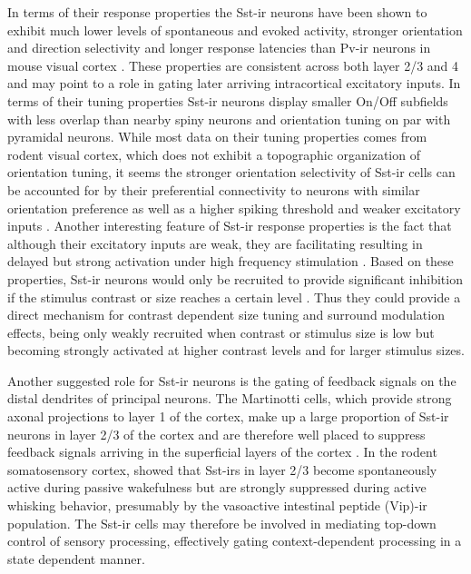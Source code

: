 In terms of their response properties the Sst-ir neurons have been
shown to exhibit much lower levels of spontaneous and evoked activity,
stronger orientation and direction selectivity and longer response
latencies than Pv-ir neurons in mouse visual cortex
\citep{Ma2011}. These properties are consistent across both layer 2/3
and 4 and may point to a role in gating later arriving intracortical
excitatory inputs. In terms of their tuning properties Sst-ir neurons
display smaller On/Off subfields with less overlap than nearby spiny
neurons and orientation tuning on par with pyramidal neurons. While
most data on their tuning properties comes from rodent visual cortex,
which does not exhibit a topographic organization of orientation
tuning, it seems the stronger orientation selectivity of Sst-ir cells
can be accounted for by their preferential connectivity to neurons
with similar orientation preference as well as a higher spiking
threshold and weaker excitatory inputs \citep{Bartley2008}. Another
interesting feature of Sst-ir response properties is the fact that
although their excitatory inputs are weak, they are facilitating
resulting in delayed but strong activation under high frequency
stimulation \citep{Beierlein2003,Bartley2008,Tan2008}. Based on these
properties, Sst-ir neurons would only be recruited to provide
significant inhibition if the stimulus contrast or size reaches a
certain level \citep{Adesnik2012}. Thus they could provide a direct
mechanism for contrast dependent size tuning and surround modulation
effects, being only weakly recruited when contrast or stimulus size is
low but becoming strongly activated at higher contrast levels and for
larger stimulus sizes.


Another suggested role for Sst-ir neurons is the gating of feedback
signals on the distal dendrites of principal neurons. The Martinotti
cells, which provide strong axonal projections to layer 1 of the
cortex, make up a large proportion of Sst-ir neurons in layer 2/3 of
the cortex and are therefore well placed to suppress feedback signals
arriving in the superficial layers of the cortex
\citep{Fanselow2008,Gentet2012}. In the rodent somatosensory cortex,
\cite{Gentet2012} showed that Sst-irs in layer 2/3 become
spontaneously active during passive wakefulness but are strongly
suppressed during active whisking behavior, presumably by the
vasoactive intestinal peptide (Vip)-ir population. The Sst-ir cells
may therefore be involved in mediating top-down control of sensory
processing, effectively gating context-dependent processing in a state
dependent manner.

